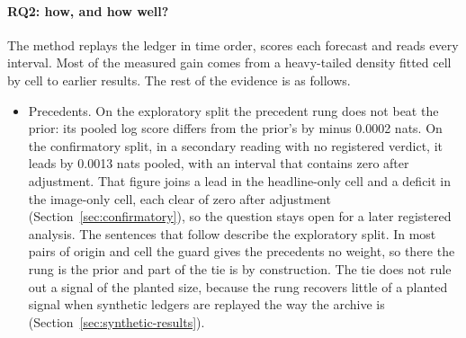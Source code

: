 \paragraph{RQ2: how, and how well?} The method replays the ledger in time order, scores each forecast and reads every interval. Most of the measured gain comes from a heavy-tailed density fitted cell by cell to earlier results. The rest of the evidence is as follows.
\begin{itemize}
\item Precedents. On the exploratory split the precedent rung does not beat the prior: its pooled log score differs from the prior's by minus 0.0002 nats. On the confirmatory split, in a secondary reading with no registered verdict, it leads by 0.0013 nats pooled, with an interval that contains zero after adjustment. That figure joins a lead in the headline-only cell and a deficit in the image-only cell, each clear of zero after adjustment (Section~\ref{sec:confirmatory}), so the question stays open for a later registered analysis. The sentences that follow describe the exploratory split. In most pairs of origin and cell the guard gives the precedents no weight, so there the rung is the prior and part of the tie is by construction. The tie does not rule out a signal of the planted size, because the rung recovers little of a planted signal when synthetic ledgers are replayed the way the archive is (Section~\ref{sec:synthetic-results}).

\end{itemize}
